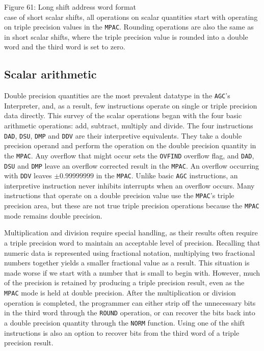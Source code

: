 \documentclass[refcap, oxford]{ahsan}
\begin{document}
Figure 61: Long shift address word format\\
case of short scalar shifts, all operations on scalar quantities start with operating on triple precision values in the \texttt{MPAC}. Rounding operations are also the same as in short scalar shifts, where the triple precision value is rounded into a double word and the third word is set to zero.


\subsection{Scalar arithmetic}
Double precision quantities are the most prevalent datatype in the \texttt{AGC}'s Interpreter, and, as a result, few instructions operate on single or triple precision data directly. This survey of the scalar operations began with the four basic arithmetic operations: add, subtract, multiply and divide. The four instructions \texttt{DAD}, \texttt{DSU}, \texttt{DMP} and \texttt{DDV} are their interpretive equivalents. They take a double precision operand and perform the operation on the double precision quantity in the \texttt{MPAC}. Any overflow that might occur sets the \texttt{OVFIND} overflow flag, and \texttt{DAD}, \texttt{DSU} and \texttt{DMP} leave an overflow corrected result in the \texttt{MPAC}. An overflow occurring with \texttt{DDV} leaves $\pm 0.99999999$ in the \texttt{MPAC}. Unlike basic \texttt{AGC} instructions, an interpretive instruction never inhibits interrupts when an overflow occurs. Many instructions that operate on a double precision value use the \texttt{MPAC}'s triple precision area, but these are not true triple precision operations because the \texttt{MPAC} mode remains double precision.

Multiplication and division require special handling, as their results often require a triple precision word to maintain an acceptable level of precision. Recalling that numeric data is represented using fractional notation, multiplying two fractional numbers together yields a smaller fractional value as a result. This situation is made worse if we start with a number that is small to begin with. However, much of the precision is retained by producing a triple precision result, even as the \texttt{MPAC} mode is held at double precision. After the multiplication or division operation is completed, the programmer can either strip off the unnecessary bits in the third word through the \texttt{ROUND} operation, or can recover the bits back into a double precision quantity through the \texttt{NORM} function. Using one of the shift instructions is also an option to recover bits from the third word of a triple precision result.
\end{document}

